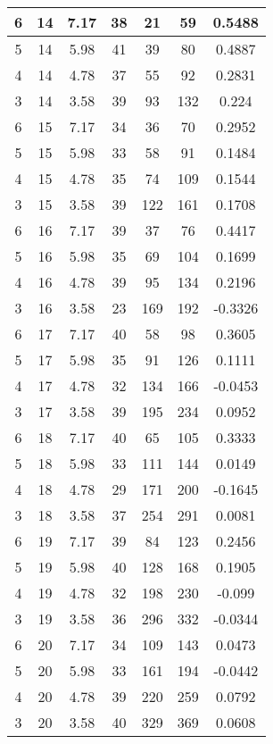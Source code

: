 \documentclass[letterpaper, 12pt]{article}
\begin{document}
\begin{longtable}{|c|c|c|c|c|c|c|}
\hline
6 & 14 & 7.17 & 38 & 21 & 59 & 0.5488 \\
\hline
5 & 14 & 5.98 & 41 & 39 & 80 & 0.4887 \\
\hline
4 & 14 & 4.78 & 37 & 55 & 92 & 0.2831 \\
\hline
3 & 14 & 3.58 & 39 & 93 & 132 & 0.224 \\
\hline
6 & 15 & 7.17 & 34 & 36 & 70 & 0.2952 \\
\hline
5 & 15 & 5.98 & 33 & 58 & 91 & 0.1484 \\
\hline
4 & 15 & 4.78 & 35 & 74 & 109 & 0.1544 \\
\hline
3 & 15 & 3.58 & 39 & 122 & 161 & 0.1708 \\
\hline
6 & 16 & 7.17 & 39 & 37 & 76 & 0.4417 \\
\hline
5 & 16 & 5.98 & 35 & 69 & 104 & 0.1699 \\
\hline
4 & 16 & 4.78 & 39 & 95 & 134 & 0.2196 \\
\hline
3 & 16 & 3.58 & 23 & 169 & 192 & -0.3326 \\
\hline
6 & 17 & 7.17 & 40 & 58 & 98 & 0.3605 \\
\hline
5 & 17 & 5.98 & 35 & 91 & 126 & 0.1111 \\
\hline
4 & 17 & 4.78 & 32 & 134 & 166 & -0.0453 \\
\hline
3 & 17 & 3.58 & 39 & 195 & 234 & 0.0952 \\
\hline
6 & 18 & 7.17 & 40 & 65 & 105 & 0.3333 \\
\hline
5 & 18 & 5.98 & 33 & 111 & 144 & 0.0149 \\
\hline
4 & 18 & 4.78 & 29 & 171 & 200 & -0.1645 \\
\hline
3 & 18 & 3.58 & 37 & 254 & 291 & 0.0081 \\
\hline
6 & 19 & 7.17 & 39 & 84 & 123 & 0.2456 \\
\hline
5 & 19 & 5.98 & 40 & 128 & 168 & 0.1905 \\
\hline
4 & 19 & 4.78 & 32 & 198 & 230 & -0.099 \\
\hline
3 & 19 & 3.58 & 36 & 296 & 332 & -0.0344 \\
\hline
6 & 20 & 7.17 & 34 & 109 & 143 & 0.0473 \\
\hline
5 & 20 & 5.98 & 33 & 161 & 194 & -0.0442 \\
\hline
4 & 20 & 4.78 & 39 & 220 & 259 & 0.0792 \\
\hline
3 & 20 & 3.58 & 40 & 329 & 369 & 0.0608 \\
\hline
\end{longtable}
\end{document}
